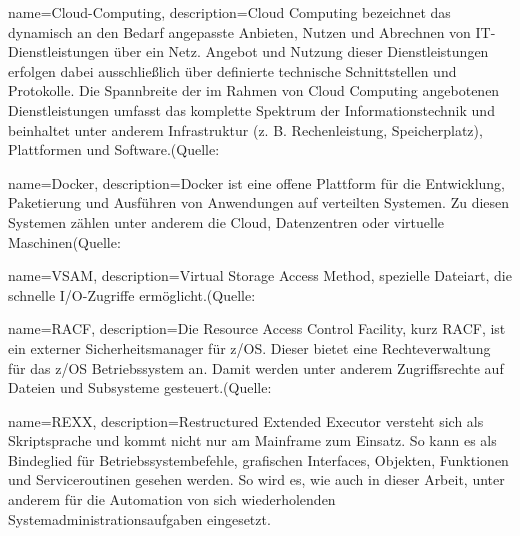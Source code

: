 {
	name=Cloud-Computing,
	description={\glqq Cloud Computing bezeichnet das dynamisch an den Bedarf angepasste Anbieten, Nutzen und Abrechnen von IT-Dienstleistungen über ein Netz. Angebot und Nutzung dieser Dienstleistungen erfolgen dabei ausschließlich über definierte technische Schnittstellen und Protokolle. Die Spannbreite der im Rahmen von Cloud Computing angebotenen Dienstleistungen umfasst das komplette Spektrum der Informationstechnik und beinhaltet unter anderem Infrastruktur (z. B. Rechenleistung, Speicherplatz), Plattformen und Software.\grqq(Quelle: \cite{.23.2.2020b}}
}

{
	name=Docker,
	description={Docker ist eine offene Plattform für die Entwicklung, Paketierung und Ausführen von Anwendungen auf verteilten Systemen. Zu diesen Systemen zählen unter anderem die Cloud, Datenzentren oder virtuelle Maschinen(Quelle: \cite{Vohra.2016}}
}

{
	name=VSAM,
	description={Virtual Storage Access Method, spezielle Dateiart, die schnelle I/O-Zugriffe ermöglicht.(Quelle: \cite[S. 2-4]{Lovelace.2013}}
}

{
	name=RACF,
	description={Die Resource Access Control Facility, kurz RACF, ist ein externer Sicherheitsmanager für z/OS.
Dieser bietet eine Rechteverwaltung für das z/OS Betriebssystem an.
Damit werden unter anderem Zugriffsrechte auf Dateien und Subsysteme gesteuert.(Quelle: \cite[S. 18-21]{InternationalBusinessMachinesCorporation.2008}}
}

{
	name=REXX,
	description={Restructured Extended Executor versteht sich als Skriptsprache und kommt nicht nur am Mainframe zum Einsatz.
So kann es als Bindeglied für Betriebssystembefehle, grafischen Interfaces, Objekten, Funktionen und Serviceroutinen gesehen werden.
So wird es, wie auch in dieser Arbeit, unter anderem für die Automation von sich wiederholenden Systemadministrationsaufgaben eingesetzt.
\cite{Fosdick.2005}}
}